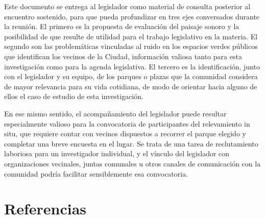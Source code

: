 \documentclass[11pt]{article}
\begin{document}
Este documento se entrega al legislador como material de consulta posterior al encuentro sostenido, para que pueda profundizar en tres ejes conversados durante la reunión. El primero es la propuesta de evaluación del paisaje sonoro y la posibilidad de que resulte de utilidad para el trabajo legislativo en la materia. El segundo son las problemáticas vinculadas al ruido en los espacios verdes públicos que identifican los vecinos de la Ciudad, información valiosa tanto para esta investigación como para la agenda legislativa. El tercero es la identificación, junto con el legislador y su equipo, de los parques o plazas que la comunidad considera de mayor relevancia para su vida cotidiana, de modo de orientar hacia alguno de ellos el caso de estudio de esta investigación.

En ese mismo sentido, el acompañamiento del legislador puede resultar especialmente valioso para la convocatoria de participantes del relevamiento in situ, que requiere contar con vecinos dispuestos a recorrer el parque elegido y completar una breve encuesta en el lugar. Se trata de una tarea de reclutamiento laboriosa para un investigador individual, y el vínculo del legislador con organizaciones vecinales, juntas comunales u otros canales de comunicación con la comunidad podría facilitar sensiblemente esa convocatoria.

\section*{Referencias}
\printbibliography[heading=none]
\end{document}
